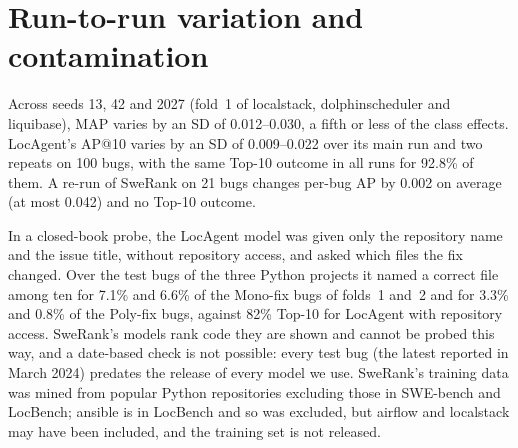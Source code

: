 \documentclass[10pt,a4paper]{article}
\begin{document}
\section{Run-to-run variation and contamination}\label{app:runs}

Across seeds 13, 42 and 2027 (fold~1 of localstack, dolphinscheduler and
liquibase), MAP varies by an SD of 0.012--0.030, a fifth or less of the class
effects. LocAgent's AP@10 varies by an SD of 0.009--0.022 over its main run and
two repeats on 100 bugs, with the same Top-10 outcome in all runs for 92.8\% of
them. A re-run of SweRank on 21 bugs changes per-bug AP by 0.002 on average (at
most 0.042) and no Top-10 outcome.

In a closed-book probe, the LocAgent model was given only the repository name
and the issue title, without repository access, and asked which files the fix
changed. Over the test bugs of the three Python projects it named a correct
file among ten for 7.1\% and 6.6\% of the Mono-fix bugs of folds~1 and~2 and
for 3.3\% and 0.8\% of the Poly-fix bugs, against 82\% Top-10 for LocAgent with
repository access. SweRank's models rank code they are shown and cannot be
probed this way, and a date-based check is not possible: every test bug (the
latest reported in March 2024) predates the release of every model we use.
SweRank's training data was mined from popular Python repositories excluding
those in SWE-bench and LocBench; ansible is in LocBench and so was excluded,
but airflow and localstack may have been included, and the training set is not
released.



\end{document}
